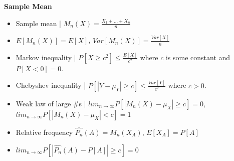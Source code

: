 \documentclass[8pt]{article}
\begin{document}
\textbf{Sample Mean}
\begin{itemize}
    \item Sample mean | $M_n(X) = \frac{X_1 + \dots + X_n}{n}$
    \item $E[M_n(X)] = E[X]$, $Var[M_n(X)] = \frac{Var[X]}{n}$
    \item Markov inequality | $P[X \geq c^2] \leq \frac{E[X]}{c^2}$ where $c$ is some constant and $P[X < 0] = 0$.
    \item Chebyshev inequality | $P[|Y - \mu_Y| \geq c] \leq \frac{Var[Y]}{c^2}$ where $c > 0$.
    \item Weak law of large \#s | $lim_{n \rightarrow \infty} P[|M_n(X) - \mu_X| \geq c] = 0$, $lim_{n \rightarrow \infty} P[|M_n(X) - \mu_X| < c] = 1$
    \item Relative frequency $\hat{P_n}(A) = M_n(X_A)$, $E[X_A] = P[A]$
    \item $lim_{n \rightarrow \infty} P[|\hat{P_n}(A) - P[A]| \geq c] = 0$
\end{itemize}
\end{document}
